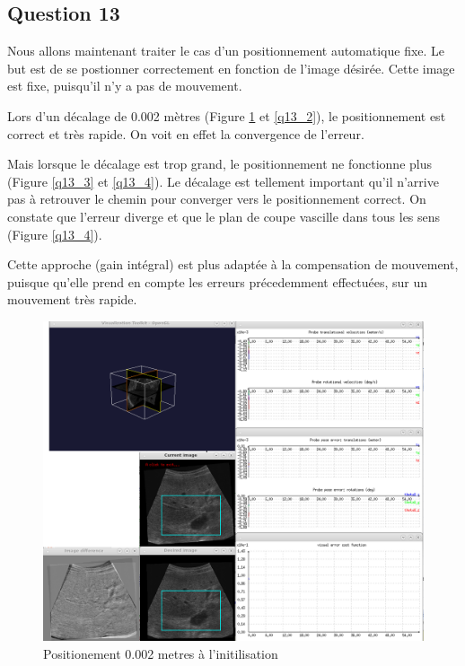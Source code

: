 \documentclass[a4paper,11pt]{article}
\begin{document}
\subsection{Question 13}

Nous allons maintenant traiter le cas d'un positionnement automatique fixe. Le but est de se postionner correctement en fonction de l'image d\'esir\'ee. Cette image est fixe, puisqu'il n'y a pas de mouvement.
\par
Lors d'un d\'ecalage de 0.002 m\`etres (Figure \ref{q13_1} et \ref{q13_2}), le positionnement est correct et tr\`es rapide. On voit en effet la convergence de l'erreur.
\par
Mais lorsque le d\'ecalage est trop grand, le positionnement ne fonctionne plus (Figure \ref{q13_3} et \ref{q13_4}). Le d\'ecalage est tellement important qu'il n'arrive pas \`a retrouver le chemin pour converger vers le positionnement correct. On constate que l'erreur diverge et que le plan de coupe vascille dans tous les sens (Figure \ref{q13_4}).
\par
Cette approche (gain int\'egral) est plus adapt\'ee \`a la compensation de mouvement, puisque qu'elle prend en compte les erreurs pr\'ecedemment effectu\'ees, sur un mouvement tr\`es rapide.
\begin{figure}[H]
    \centering
    \includegraphics[width=0.5\textheight]{./images/q13_0,002_begin.png}
    \caption{ Positionement 0.002 metres \`a l'initilisation }
    \label{q13_1}
\end{figure}
\end{document}
